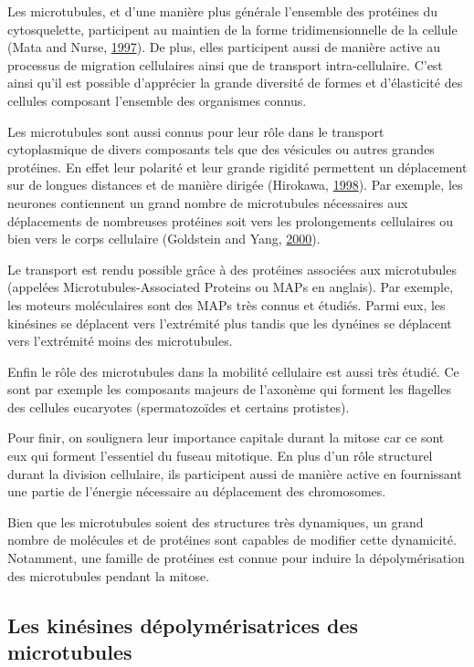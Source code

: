 \documentclass[12pt,a4paper,twoside,openright]{book}
\begin{document}
Les microtubules, et d'une manière plus générale l'ensemble des
protéines du cytosquelette, participent au maintien de la forme
tridimensionnelle de la cellule (Mata and Nurse,
\protect\hyperlink{ref-Mata1997}{1997}). De plus, elles participent
aussi de manière active au processus de migration cellulaires ainsi que
de transport intra-cellulaire. C'est ainsi qu'il est possible
d'apprécier la grande diversité de formes et d'élasticité des cellules
composant l'ensemble des organismes connus.

Les microtubules sont aussi connus pour leur rôle dans le transport
cytoplasmique de divers composants tels que des vésicules ou autres
grandes protéines. En effet leur polarité et leur grande rigidité
permettent un déplacement sur de longues distances et de manière dirigée
(Hirokawa, \protect\hyperlink{ref-Hirokawa1998}{1998}). Par exemple, les
neurones contiennent un grand nombre de microtubules nécessaires aux
déplacements de nombreuses protéines soit vers les prolongements
cellulaires ou bien vers le corps cellulaire (Goldstein and Yang,
\protect\hyperlink{ref-Goldstein2000}{2000}).

Le transport est rendu possible grâce à des protéines associées aux
microtubules (appelées Microtubules-Associated Proteins ou MAPs en
anglais). Par exemple, les moteurs moléculaires sont des MAPs très
connus et étudiés. Parmi eux, les kinésines se déplacent vers
l'extrémité plus tandis que les dynéines se déplacent vers l'extrémité
moins des microtubules.

Enfin le rôle des microtubules dans la mobilité cellulaire est aussi
très étudié. Ce sont par exemple les composants majeurs de l'axonème qui
forment les flagelles des cellules eucaryotes (spermatozoïdes et
certains protistes).

Pour finir, on soulignera leur importance capitale durant la mitose car
ce sont eux qui forment l'essentiel du fuseau mitotique. En plus d'un
rôle structurel durant la division cellulaire, ils participent aussi de
manière active en fournissant une partie de l'énergie nécessaire au
déplacement des chromosomes.

Bien que les microtubules soient des structures très dynamiques, un
grand nombre de molécules et de protéines sont capables de modifier
cette dynamicité. Notamment, une famille de protéines est connue pour
induire la dépolymérisation des microtubules pendant la mitose.

\subsection{Les kinésines dépolymérisatrices des
microtubules}\label{les-kinuxe9sines-duxe9polymuxe9risatrices-des-microtubules}
\end{document}

